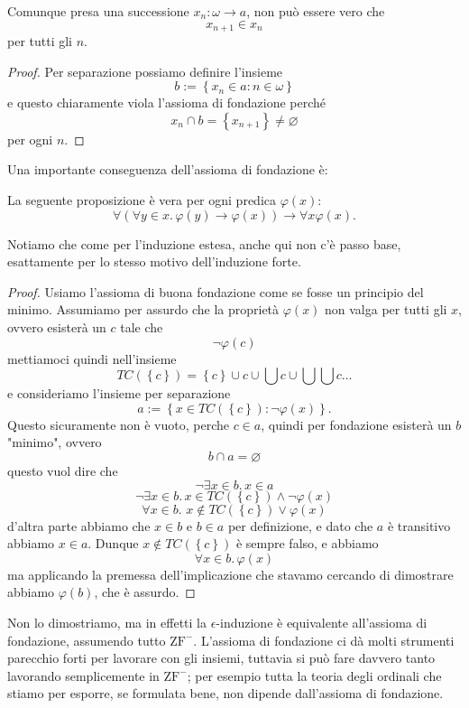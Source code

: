 \documentclass[11pt]{scrartcl}
\newcommand{\eset}{\varnothing}
\begin{document}
 	\begin{corollary}
 		Comunque presa una successione $x_n:\omega\to a$, non può essere vero che
 		$$x_{n+1}\in x_n$$
 		per tutti gli $n$.
 	\end{corollary}
 	\begin{proof}
 		Per separazione possiamo definire l'insieme
 		$$b:=\left\{x_n\in a : n\in \omega\right\}$$
 		e questo chiaramente viola l'assioma di fondazione perché
 		$$x_n\cap b=\left\{x_{n+1}\right\}\ne \eset$$
 		per ogni $n$.
 	\end{proof}
 	Una importante conseguenza dell'assioma di fondazione è:
 	\begin{proposition}
 		La seguente proposizione è vera per ogni predica $\varphi(x)$:
 		$$\forall\left(\forall y\in x.\, \varphi(y)\to \varphi(x)\right)\to \forall x\varphi(x).$$
 	\end{proposition}
 	\begin{remark}
 		Notiamo che come per l'induzione estesa, anche qui non c'è passo base, esattamente per lo stesso motivo dell'induzione forte.
 	\end{remark}
 	\begin{proof}
 		Usiamo l'assioma di buona fondazione come se fosse un principio del minimo. Assumiamo per assurdo che la proprietà $\varphi(x)$ non valga per tutti gli $x$, ovvero esisterà un $c$ tale che
 		$$\lnot \varphi(c)$$
 		mettiamoci quindi nell'insieme 
 		$$TC(\left\{c\right\})=\left\{c\right\}\cup c \cup \bigcup c \cup \bigcup \bigcup c \dots$$
 		e consideriamo l'insieme per separazione
 		$$a:=\left\{x\in TC(\left\{c\right\}):\lnot \varphi(x)\right\}.$$
 		Questo sicuramente non è vuoto, perche $c\in a$, quindi per fondazione esisterà un $b$ "minimo", ovvero
 		$$b\cap a=\eset$$
 		questo vuol dire che 
 		$$\lnot \exists x\in b.\, x\in a$$
 		$$\lnot \exists x\in b.\, x\in TC(\left\{c\right\})\land \lnot\varphi(x)$$
 		$$\forall x \in b. \,\, x\not\in TC(\left\{c\right\})\lor \varphi(x)$$
 		d'altra parte abbiamo che $x\in b$ e $b\in a$ per definizione, e dato che $a$ è transitivo abbiamo $x\in a$. Dunque $x\not\in TC(\left\{c\right\})$ è sempre falso, e abbiamo
 		$$\forall x\in b. \, \varphi(x)$$
 		ma applicando la premessa dell'implicazione che stavamo cercando di dimostrare abbiamo $\varphi(b)$, che è assurdo.
 	\end{proof}
 	Non lo dimostriamo, ma in effetti la $\epsilon$-induzione è equivalente all'assioma di fondazione, assumendo tutto $\text{ZF}^-$. L'assioma di fondazione ci dà molti strumenti parecchio forti per lavorare con gli insiemi, tuttavia si può fare davvero tanto lavorando semplicemente in $\text{ZF}^-$; per esempio tutta la teoria degli ordinali che stiamo per esporre, se formulata bene, non dipende dall'assioma di fondazione.
\end{document}
